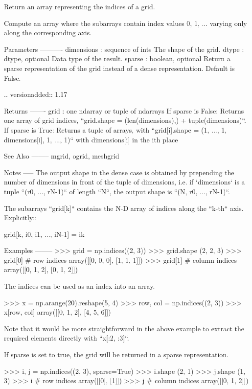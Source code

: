 \begin{DoxyVerb}Return an array representing the indices of a grid.

Compute an array where the subarrays contain index values 0, 1, ...
varying only along the corresponding axis.

Parameters
----------
dimensions : sequence of ints
    The shape of the grid.
dtype : dtype, optional
    Data type of the result.
sparse : boolean, optional
    Return a sparse representation of the grid instead of a dense
    representation. Default is False.

    .. versionadded:: 1.17

Returns
-------
grid : one ndarray or tuple of ndarrays
    If sparse is False:
        Returns one array of grid indices,
        ``grid.shape = (len(dimensions),) + tuple(dimensions)``.
    If sparse is True:
        Returns a tuple of arrays, with
        ``grid[i].shape = (1, ..., 1, dimensions[i], 1, ..., 1)`` with
        dimensions[i] in the ith place

See Also
--------
mgrid, ogrid, meshgrid

Notes
-----
The output shape in the dense case is obtained by prepending the number
of dimensions in front of the tuple of dimensions, i.e. if `dimensions`
is a tuple ``(r0, ..., rN-1)`` of length ``N``, the output shape is
``(N, r0, ..., rN-1)``.

The subarrays ``grid[k]`` contains the N-D array of indices along the
``k-th`` axis. Explicitly::

    grid[k, i0, i1, ..., iN-1] = ik

Examples
--------
>>> grid = np.indices((2, 3))
>>> grid.shape
(2, 2, 3)
>>> grid[0]        # row indices
array([[0, 0, 0],
       [1, 1, 1]])
>>> grid[1]        # column indices
array([[0, 1, 2],
       [0, 1, 2]])

The indices can be used as an index into an array.

>>> x = np.arange(20).reshape(5, 4)
>>> row, col = np.indices((2, 3))
>>> x[row, col]
array([[0, 1, 2],
       [4, 5, 6]])

Note that it would be more straightforward in the above example to
extract the required elements directly with ``x[:2, :3]``.

If sparse is set to true, the grid will be returned in a sparse
representation.

>>> i, j = np.indices((2, 3), sparse=True)
>>> i.shape
(2, 1)
>>> j.shape
(1, 3)
>>> i        # row indices
array([[0],
       [1]])
>>> j        # column indices
array([[0, 1, 2]])\end{DoxyVerb}
 \mbox{\label{namespacenumpy_1_1core_1_1numeric_a6874bed1b6f01fc26401509337d83ea4}} 
